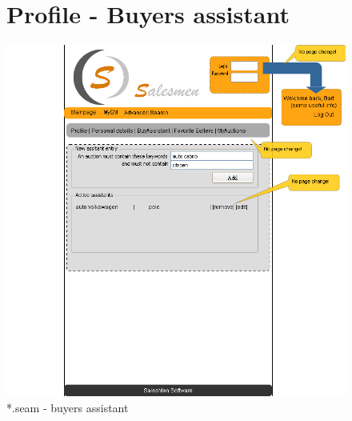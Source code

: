 \documentclass[salesmen, twoside]{../../../templates/latex/2009/softproj}
\begin{document}
\begin{projdoc}
\begin{figure}
\section{Profile - Buyers assistant}
\label{fig_prototype_buyer_assistant}
\includegraphics[width=15cm]{../../img/SM_mySM_buy_assistant.png}
\caption{*.seam - buyers assistant}
\end{figure}
\begin{figure}

\end{figure}
\end{projdoc}
\end{document}
